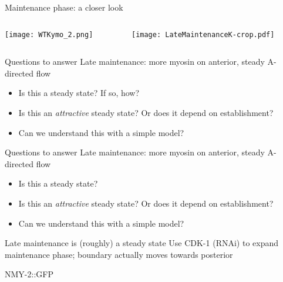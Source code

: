 \documentclass{beamer}
\newcommand{\6}[1]{#1_{\text{6}}}
\newcommand{\3}[1]{#1_{\text{3}}}
\newcommand{\lightgray}[1]{\color{lightgray}#1\normalcolor}
\begin{document}
\begin{frame}{Maintenance phase: a closer look}
\begin{columns}
\begin{column}{0.5\textwidth}
\pause
\texttt{[image: WTKymo\_2.png]}
\end{column}
\pause
\begin{column}{0.5\textwidth}
\texttt{[image: LateMaintenanceK-crop.pdf]}
\end{column}
\end{columns}
\end{frame}

\begin{frame}{Questions to answer}
Late maintenance: more myosin on anterior, steady A-directed flow
\begin{itemize}\pause
\item Is this a steady state? If so, how? \pause
\item Is this an \emph{attractive} steady state? Or does it depend on establishment? \pause
\item Can we understand this with a simple model?
\end{itemize}
\end{frame}

\begin{frame}{Questions to answer}
Late maintenance: more myosin on anterior, steady A-directed flow
\begin{itemize}
\item Is this a steady state?
\item \lightgray{Is this an \emph{attractive} steady state? Or does it depend on establishment?}
\item \lightgray{ Can we understand this with a simple model?}
\end{itemize}
\end{frame}

\begin{frame}{Late maintenance is (roughly) a steady state}
Use CDK-1 (RNAi) to expand maintenance phase; boundary actually moves towards posterior

\begin{center}
NMY-2::GFP

\end{center}

\end{frame}
\end{document}
